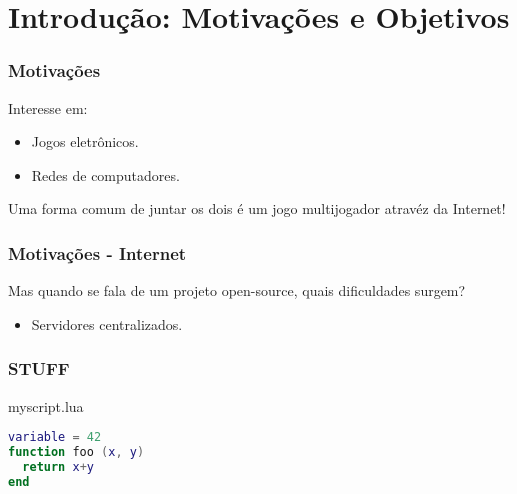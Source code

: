 \documentclass[brazil]{beamer}
\begin{document}
\section{Introdução: Motivações e Objetivos}
\begin{frame}[fragile]
  \frametitle{Motivações}
  Interesse em:
  \begin{itemize}
    \item Jogos eletrônicos.
    \item Redes de computadores.
  \end{itemize}
  \pause
  \vspace{30pt}
  Uma forma comum de juntar os dois é um jogo multijogador atravéz da Internet!
\end{frame}
\begin{frame}[fragile]
  \frametitle{Motivações - Internet}
  Mas quando se fala de um projeto open-source, quais dificuldades surgem?
  \pause
  \begin{itemize}
    \item Servidores centralizados.
  \end{itemize}
\end{frame}
\begin{frame}[fragile]
  \frametitle{STUFF}
  \pause
  \begin{block}{myscript.lua}
    \begin{lstlisting}[language=lua]
variable = 42
function foo (x, y)
  return x+y
end
    \end{lstlisting}
  \end{block}
\end{frame}
\end{document}
